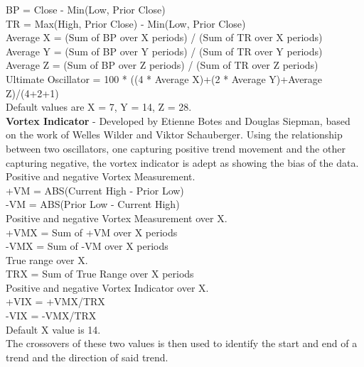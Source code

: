 \documentclass[conference]{IEEEtran}
\begin{document}
\noindent
BP = Close - Min(Low, Prior Close)\\
TR = Max(High, Prior Close)  -  Min(Low, Prior Close)\\

\noindent
Average X = (Sum of BP over X periods) / (Sum of TR over X periods)\\
Average Y = (Sum of BP over Y periods) / (Sum of TR over Y periods)\\
Average Z = (Sum of BP over Z periods) / (Sum of TR over Z periods)\\

\noindent
Ultimate Oscillator = 100 * ((4 * Average X)+(2 * Average Y)+Average Z)/(4+2+1)\\
Default values are X = 7, Y = 14, Z = 28.\\

\noindent
\textbf{Vortex Indicator} - Developed by Etienne Botes and Douglas Siepman, based on the work of Welles Wilder and Viktor Schauberger. Using the relationship between two oscillators, one capturing positive trend movement and the other capturing negative, the vortex indicator is adept as showing the bias of the data.\\

\noindent
Positive and negative Vortex Measurement.\\
+VM = ABS(Current High - Prior Low)\\
-VM = ABS(Prior Low - Current High)\\

\noindent
Positive and negative Vortex Measurement over X.\\
+VMX = Sum of +VM over X periods \\
-VMX = Sum of -VM over X periods \\

\noindent
True range over X.\\
TRX = Sum of True Range over X periods \\

\noindent
Positive and negative Vortex Indicator over X.\\
+VIX = +VMX/TRX \\
-VIX = -VMX/TRX \\

\noindent
Default X value is 14.\\

\noindent
The crossovers of these two values is then used to identify the start and end of a trend and the direction of said trend.\\
\end{document}
